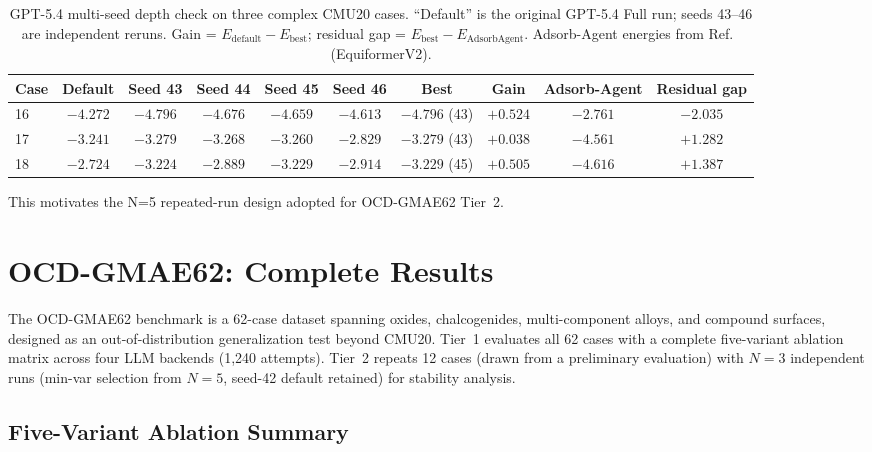 \documentclass[%
 preprint,
 superscriptaddress,
 amsmath,amssymb,
 aps,
 prb,
 floatfix,
]{revtex4-2}
\begin{document}
\begin{table}[ht]
\centering
\caption{GPT-5.4 multi-seed depth check on three complex CMU20 cases. ``Default'' is the original GPT-5.4 Full run; seeds 43--46 are independent reruns. Gain = $E_\mathrm{default} - E_\mathrm{best}$; residual gap = $E_\mathrm{best} - E_\mathrm{AdsorbAgent}$. Adsorb-Agent energies from Ref.~ (EquiformerV2).}
\label{tab:si-multiseed}
\begin{tabular}{lccccccccc}
\toprule
Case & Default & Seed 43 & Seed 44 & Seed 45 & Seed 46 & Best & Gain & Adsorb-Agent & Residual gap \\
\midrule
16 & $-4.272$ & $-4.796$ & $-4.676$ & $-4.659$ & $-4.613$ & $-4.796$ (43) & $+0.524$ & $-2.761$ & $-2.035$ \\
17 & $-3.241$ & $-3.279$ & $-3.268$ & $-3.260$ & $-2.829$ & $-3.279$ (43) & $+0.038$ & $-4.561$ & $+1.282$ \\
18 & $-2.724$ & $-3.224$ & $-2.889$ & $-3.229$ & $-2.914$ & $-3.229$ (45) & $+0.505$ & $-4.616$ & $+1.387$ \\
\bottomrule
\end{tabular}%
\end{table}

This motivates the N=5 repeated-run design adopted for OCD-GMAE62 Tier~2.



\section{OCD-GMAE62: Complete Results}

The OCD-GMAE62 benchmark is a 62-case dataset spanning oxides, chalcogenides, multi-component alloys, and compound surfaces, designed as an out-of-distribution generalization test beyond CMU20.
Tier~1 evaluates all 62 cases with a complete five-variant ablation matrix across four LLM backends (1{,}240 attempts).
Tier~2 repeats 12 cases (drawn from a preliminary evaluation) with $N=3$ independent runs (min-var selection from $N=5$, seed-42 default retained) for stability analysis.

\subsection{Five-Variant Ablation Summary}
\end{document}

